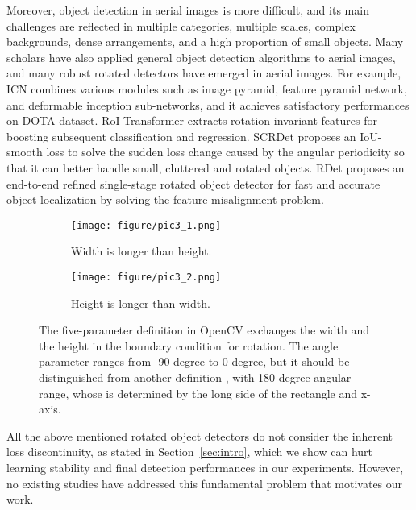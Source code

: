 \documentclass[10pt,twocolumn,letterpaper]{article}
\begin{document}
Moreover, object detection in aerial images is more difficult, and its main challenges are reflected in multiple categories, multiple scales, complex backgrounds, dense arrangements, and a high proportion of small objects. Many scholars have also applied general object detection algorithms to aerial images, and many robust rotated detectors have emerged in aerial images. For example, ICN \cite{R27_azimi2018towards} combines various modules such as image pyramid, feature pyramid network, and deformable inception sub-networks, and it achieves satisfactory performances on DOTA dataset. RoI Transformer \cite{R29_ding2018learning} extracts rotation-invariant features for boosting subsequent classification and regression. SCRDet \cite{R28_Yang2018SCRDet} proposes an IoU-smooth  loss to solve the sudden loss change caused by the angular periodicity so that it can better handle small, cluttered and rotated objects. RDet \cite{R20_Yang2019R3Det} proposes an end-to-end refined single-stage rotated object detector for fast and accurate object localization by solving the feature misalignment problem.

\begin{figure}[t]
    \centering
    \begin{subfigure}{.235\textwidth}
        \centering    \texttt{[image: figure/pic3\_1.png]}
        \caption{Width is longer than height.}
        \label{fig:3_1}
    \end{subfigure}
    \centering
    \begin{subfigure}{.235\textwidth}
        \centering    \texttt{[image: figure/pic3\_2.png]}
        \caption{Height is longer than width.}
        \label{fig:3_2}
    \end{subfigure}
    \vspace{-10pt}
    \caption{The five-parameter definition in OpenCV exchanges the width and the height in the boundary condition for rotation. The angle parameter  ranges from -90 degree to 0 degree, but it should be distinguished from another definition \cite{R18_xia2018dota}, with 180 degree angular range, whose  is determined by the long side of the rectangle and x-axis.}
    \label{fig:define}
    \vspace{-15pt}
\end{figure}

All the above mentioned rotated object detectors do not consider the inherent loss discontinuity, as stated in Section~\ref{sec:intro}, which we show can hurt learning stability and final detection performances in our experiments. However, no existing studies have addressed this fundamental problem that motivates our work.
\vspace{-5pt}
\end{document}

